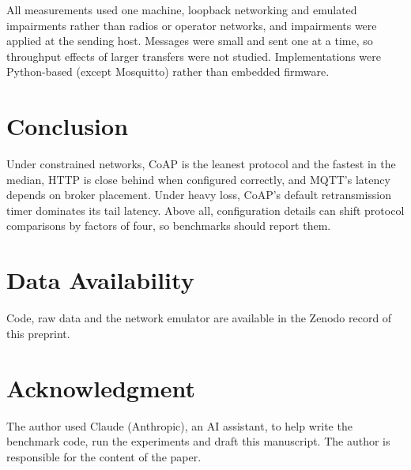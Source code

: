 \documentclass[conference]{IEEEtran}
\begin{document}
All measurements used one machine, loopback networking and emulated impairments rather than radios or operator networks, and impairments were applied at the sending host. Messages were small and sent one at a time, so throughput effects of larger transfers were not studied. Implementations were Python-based (except Mosquitto) rather than embedded firmware.

\section{Conclusion}
Under constrained networks, CoAP is the leanest protocol and the fastest in the median, HTTP is close behind when configured correctly, and MQTT's latency depends on broker placement. Under heavy loss, CoAP's default retransmission timer dominates its tail latency. Above all, configuration details can shift protocol comparisons by factors of four, so benchmarks should report them.

\section*{Data Availability}
Code, raw data and the network emulator are available in the Zenodo record of this preprint.

\section*{Acknowledgment}
The author used Claude (Anthropic), an AI assistant, to help write the benchmark code, run the experiments and draft this manuscript. The author is responsible for the content of the paper.



\end{document}
